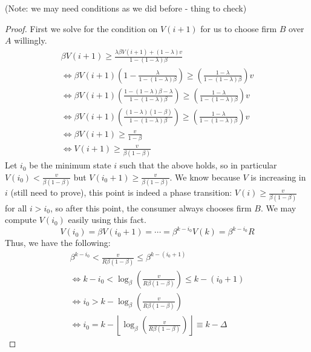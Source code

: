 \documentclass{article}
\begin{document}
(Note: we may need conditions as we did before - thing to check)

\begin{proof}
First we solve for the condition on $V(i+1)$ for us to choose firm $B$ over $A$ willingly.
\begin{gather*}
\beta V(i+1) \geq \frac{\lambda \beta V(i+1) + (1-\lambda)v}{1-(1-\lambda)\beta} \\
\iff \beta V(i+1) \left(1-\frac{\lambda}{1-(1-\lambda)\beta} \right) \geq \left(\frac{1-\lambda}{1-(1-\lambda)\beta} \right) v \\
\iff \beta V(i+1) \left(\frac{1-(1-\lambda)\beta -\lambda}{1-(1-\lambda)\beta} \right) \geq \left(\frac{1-\lambda}{1-(1-\lambda)\beta} \right) v \\
\iff \beta V(i+1) \left(\frac{(1-\lambda)(1-\beta)}{1-(1-\lambda)\beta} \right) \geq \left(\frac{1-\lambda}{1-(1-\lambda)\beta} \right) v \\
\iff \beta V(i+1) \geq \frac{v}{1-\beta} \\
\iff V(i+1) \geq \frac{v}{\beta(1-\beta)}
\end{gather*}
Let $i_0$ be the minimum state $i$ such that the above holds, so in particular $V(i_0) < \frac{v}{\beta(1-\beta)}$ but $V(i_0+1) \geq \frac{v}{\beta(1-\beta)}$. We know because $V$ is increasing in $i$ (still need to prove), this point is indeed a phase transition: $V(i) \geq \frac{v}{\beta(1-\beta)}$ for all $i > i_0$, so after this point, the consumer always chooses firm $B$. We may compute $V(i_0)$ easily using this fact.
\begin{equation*}
V(i_0) = \beta V(i_0+1) = \cdots = \beta^{k-i_0}V(k) = \beta^{k-i_0}R
\end{equation*}
Thus, we have the following:
\begin{gather*}
\beta^{k-i_0} < \frac{v}{R\beta(1-\beta)} \leq \beta^{k-(i_0+1)} \\ 
\iff k-i_0 < \log_{\beta}\left(\frac{v}{R\beta(1-\beta)} \right) \leq k-(i_0+1) \\
\iff i_0 > k - \log_{\beta}\left(\frac{v}{R\beta(1-\beta)} \right) \\
\iff i_0 = k - \left\lfloor \log_{\beta}\left(\frac{v}{R\beta(1-\beta)} \right) \right\rfloor \equiv k-\Delta
\end{gather*}
\end{proof}
\end{document}

